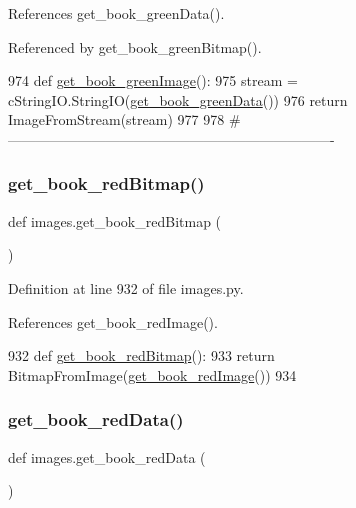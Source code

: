 References get\+\_\+book\+\_\+green\+Data().



Referenced by get\+\_\+book\+\_\+green\+Bitmap().


\begin{DoxyCode}
974 \textcolor{keyword}{def }\hyperlink{namespaceimages_a2b9a8cbc20f7bf72e18cac42aff4dca7}{get\_book\_greenImage}():
975     stream = cStringIO.StringIO(\hyperlink{namespaceimages_abfee1f116e5f3604f71862b5a039049b}{get\_book\_greenData}())
976     \textcolor{keywordflow}{return} ImageFromStream(stream)
977 
978 \textcolor{comment}{#----------------------------------------------------------------------}
\end{DoxyCode}
\mbox{\label{namespaceimages_a0bedc3472fa89f335bdcd8607d77edf9}} 
\subsubsection{\texorpdfstring{get\+\_\+book\+\_\+red\+Bitmap()}{get\_book\_redBitmap()}}
{\footnotesize\ttfamily def images.\+get\+\_\+book\+\_\+red\+Bitmap (\begin{DoxyParamCaption}{ }\end{DoxyParamCaption})}



Definition at line 932 of file images.\+py.



References get\+\_\+book\+\_\+red\+Image().


\begin{DoxyCode}
932 \textcolor{keyword}{def }\hyperlink{namespaceimages_a0bedc3472fa89f335bdcd8607d77edf9}{get\_book\_redBitmap}():
933     \textcolor{keywordflow}{return} BitmapFromImage(\hyperlink{namespaceimages_a0e1759b6e5c78ef3b1f0b39fc7348e80}{get\_book\_redImage}())
934 
\end{DoxyCode}
\mbox{\label{namespaceimages_a1d69045b3511549861c0100d3448f9a6}} 
\subsubsection{\texorpdfstring{get\+\_\+book\+\_\+red\+Data()}{get\_book\_redData()}}
{\footnotesize\ttfamily def images.\+get\+\_\+book\+\_\+red\+Data (\begin{DoxyParamCaption}{ }\end{DoxyParamCaption})}



